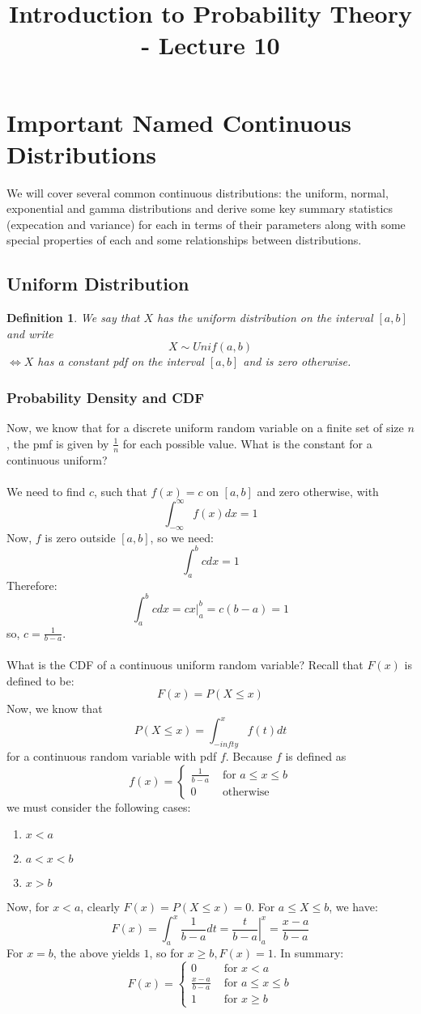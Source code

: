 \documentclass[12pt]{article} %
\title{Introduction to Probability Theory - Lecture 10}
\newtheorem{defn}{Definition}
\begin{document}
\maketitle

\section{Important Named Continuous Distributions}
We will cover several common continuous distributions: the uniform, normal, exponential and gamma distributions and derive some key summary statistics (expecation and variance) for each in terms of their parameters along with some special properties of each and some relationships between distributions.
\subsection{Uniform Distribution}
\begin{defn}
We say that $X$ has the \emph{uniform distribution on the interval $[a,b]$} and write
$$X\sim Unif(a,b)$$
$\iff X$ has a constant pdf on the interval $[a,b]$ and is zero otherwise. 
\end{defn}
\subsubsection{Probability Density and CDF}
Now, we know that for a discrete uniform random variable on a finite set of size $n$, the pmf is given by $\frac1n$ for each possible value. What is the constant for a continuous uniform?\\\\
We need to find $c$, such that $f(x) = c$ on $[a,b]$ and zero otherwise, with 
$$\int_{-\infty}^{\infty} f(x) dx = 1 $$
Now, $f$ is zero outside $[a,b]$, so we need:
$$\int_a^b c dx = 1$$
Therefore:
$$\int_a^b c dx = cx\rvert_a^b = c(b-a) = 1$$
so, $c=\frac{1}{b-a}$.\\\\
What is the CDF of a continuous uniform random variable? Recall that $F(x)$ is defined to be:
$$F(x) = P(X\leq x)$$
Now, we know that 
$$P(X\leq x) = \int_{-infty}^{x} f(t) dt$$
for a continuous random variable with pdf $f$. Because $f$ is defined as
$$f(x) = \left\{\begin{matrix}
\frac1{b-a} & \textrm { for } a\leq x\leq b\\
0 & \textrm { otherwise}
\end{matrix}\right.$$
we must consider the following cases:
\begin{enumerate}
\item $x<a$
\item $a<x<b$
\item $x>b$
\end{enumerate}
Now, for $x<a$, clearly $F(x) = P(X\leq x) = 0$. For $a\leq X \leq b$, we have:
$$F(x) = \int_a^x \frac1{b-a} dt = \left.\frac t{b-a}\right\rvert_a^x = \frac{x-a}{b-a}$$  
For $x=b$, the above yields $1$, so for $x\geq b, F(x) =1$. In summary:
$$F(x) = \left\{\begin{matrix}
0 & \textrm{ for } x<a\\
\frac{x-a}{b-a}& \textrm{ for } a\leq x\leq b\\
1 & \textrm{ for } x\geq b 
\end{matrix}\right.$$
\end{document}
